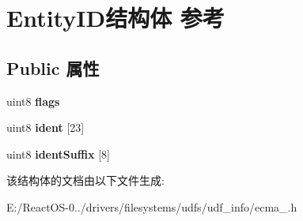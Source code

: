 \hypertarget{struct_entity_i_d}{}\section{Entity\+I\+D结构体 参考}
\label{struct_entity_i_d}
\subsection*{Public 属性}
\begin{DoxyCompactItemize}
\item 
\mbox{\label{struct_entity_i_d_af29699220e2220a688e7db30a43d2021}} 
uint8 {\bfseries flags}
\item 
\mbox{\label{struct_entity_i_d_a6eaafd2b5bae64a7845d442f81a02dbd}} 
uint8 {\bfseries ident} \mbox{[}23\mbox{]}
\item 
\mbox{\label{struct_entity_i_d_a9ce509326d485e02d693dbd01ba6658a}} 
uint8 {\bfseries ident\+Suffix} \mbox{[}8\mbox{]}
\end{DoxyCompactItemize}


该结构体的文档由以下文件生成\+:\begin{DoxyCompactItemize}
\item 
E\+:/\+React\+O\+S-\/0../drivers/filesystems/udfs/udf\+\_\+info/ecma\+\_.\+h\end{DoxyCompactItemize}
